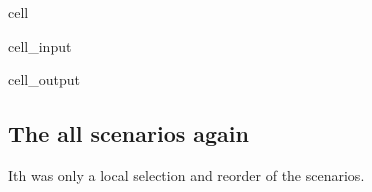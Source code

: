 \documentclass[letterpaper,10pt,english]{jupyterBook}
\begin{document}
\begin{sphinxuseclass}{cell}\begin{sphinxVerbatimInput}

\begin{sphinxuseclass}{cell_input}
\begin{sphinxVerbatim}[commandchars=\\\{\}]
   
\end{sphinxVerbatim}

\end{sphinxuseclass}\end{sphinxVerbatimInput}
\begin{sphinxVerbatimOutput}

\begin{sphinxuseclass}{cell_output}
\noindent{}

\end{sphinxuseclass}\end{sphinxVerbatimOutput}

\end{sphinxuseclass}

\subsection{The all scenarios again}
\label{\detokenize{content/howto/keep/Create and modify charts with keep_plot:the-all-scenarios-again}}
\sphinxAtStartPar
Ith was only a local selection and reorder of the scenarios. 
\end{document}
